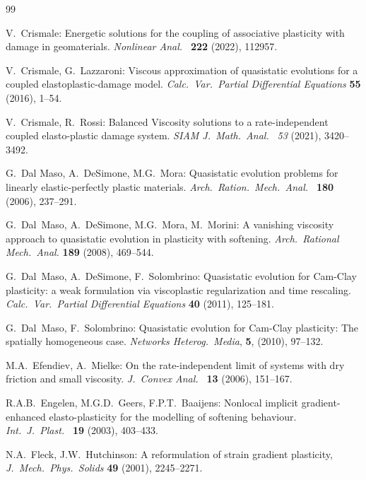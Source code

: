\documentclass[reqno]{amsart}
\theoremstyle{definition}
\numberwithin{equation}{section}
\begin{document}
\begin{thebibliography}{99}

{\sc V.~Crismale}: 
Energetic solutions for the coupling of associative plasticity with damage in geomaterials. 
{\it Nonlinear Anal.\ } {\bf 222} (2022), 112957.

{\sc V.~Crismale, G.~Lazzaroni}: 
Viscous approximation of quasistatic evolutions for a coupled elastoplastic-damage model.
{\it Calc.\ Var.\ Partial Differential Equations} {\bf 55} (2016), 1--54.

{\sc V.~Crismale, R.~Rossi}:
 Balanced Viscosity solutions to a rate-independent coupled elasto-plastic damage system.
 {\it SIAM J.\ Math.\ Anal.\ } {\it 53} (2021), 3420--3492.

{\sc G.~Dal Maso, A.~DeSimone, M.G.~Mora}: 
Quasistatic evolution problems for linearly elastic-perfectly plastic materials. 
{\it Arch.\ Ration.\ Mech.\ Anal.\ } {\bf 180} (2006), 237--291.

{\sc G.~Dal~Maso, A.~DeSimone, M.G.~Mora, M.~Morini}:
A vanishing viscosity approach to quasistatic evolution in plasticity with softening. 
{\it Arch.\ Rational Mech.\ Anal.} {\bf 189} (2008), 469--544.

{\sc G.~Dal~Maso, A.~DeSimone, F.~Solombrino}:
Quasistatic evolution for Cam-Clay plasticity: a weak formulation via viscoplastic regularization and time rescaling.
{\it Calc.\ Var.\ Partial Differential Equations} {\bf 40} (2011), 125--181.

{\sc G.~Dal~Maso, F.~Solombrino}:
Quasistatic evolution for Cam-Clay plasticity: The spatially homogeneous case. 
{\it Networks Heterog.\ Media}, {\bf 5}, (2010), 97--132.

{\sc M.A.~Efendiev, A.~Mielke}: 
On the rate-independent limit of systems with dry friction and small viscosity.
{\it J.\ Convex Anal.\ } {\bf 13} (2006), 151--167.

{\sc R.A.B.~Engelen, M.G.D.~Geers, F.P.T.~Baaijens}: 
Nonlocal implicit gradient-enhanced elasto-plasticity for the modelling of softening behaviour.
{\it Int.\ J.\ Plast.\ } {\bf 19} (2003), 403--433.

{\sc N.A.~Fleck, J.W.~Hutchinson}: 
A reformulation of strain gradient plasticity, 
{\it J.\ Mech.\ Phys.\ Solids} {\bf 49} (2001), 2245--2271.


\end{thebibliography}
\end{document}
